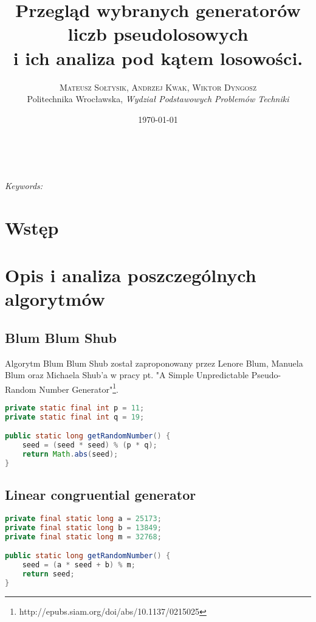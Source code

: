 \documentclass[a4paper, 11pt]{article} %
\title{\textbf{Przegląd wybranych generatorów liczb pseudolosowych}\\ %
i ich analiza pod kątem losowości.} %
\author{\textsc{Mateusz Sołtysik, Andrzej Kwak, Wiktor Dyngosz} %
\\{Politechnika Wrocławska, \textit{Wydział Podstawowych Problemów Techniki}}} %
\date{\today} %
\makeatletter
\renewcommand{\maketitle}{ %
\begin{flushright} %
{\LARGE\@title} %

\vspace{50pt} %

{\large\@author} %
\\\@date %

\vspace{40pt} %
\end{flushright}
}
\makeatother
\begin{document}
\maketitle %



\begin{abstract}
\end{abstract}

\hspace*{3,6mm}\textit{Keywords:} 

\vspace{30pt} %

\section*{Wstęp}

\section{Opis i analiza poszczególnych algorytmów}

\subsection{Blum Blum Shub}
Algorytm Blum Blum Shub został zaproponowany przez Lenore Blum, Manuela Blum oraz Michaela Shub'a w pracy pt. "A Simple Unpredictable Pseudo-Random Number Generator"\footnote{http://epubs.siam.org/doi/abs/10.1137/0215025}.
\begin{lstlisting}[style=mystyle, language=java, frame=single]
private static final int p = 11;
private static final int q = 19;

public static long getRandomNumber() {
    seed = (seed * seed) % (p * q);
    return Math.abs(seed);
}
\end{lstlisting}

\subsection{Linear congruential generator}
\begin{lstlisting}[style=mystyle, language=java, frame=single]
private final static long a = 25173;
private final static long b = 13849;
private final static long m = 32768;

public static long getRandomNumber() {
    seed = (a * seed + b) % m;
    return seed;
}
\end{lstlisting}
\end{document}
